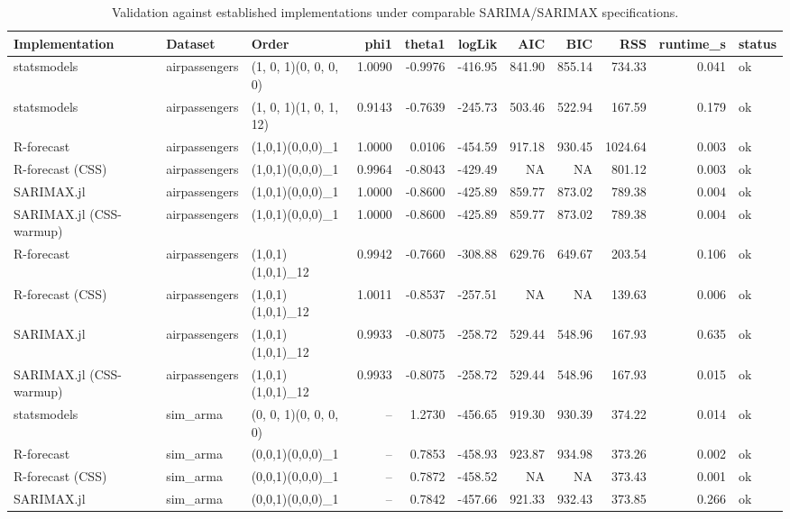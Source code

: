 \begin{table}[t]
\centering
\caption{Validation against established implementations under comparable SARIMA/SARIMAX specifications.}
\label{tab:validation_implementations}
\begin{tabular}{lllrrrrrrrl}
\hline
Implementation & Dataset & Order & phi1 & theta1 & logLik & AIC & BIC & RSS & runtime\_s & status \\
\hline
statsmodels & airpassengers & (1, 0, 1)(0, 0, 0, 0) & 1.0090 & -0.9976 & -416.95 & 841.90 & 855.14 & 734.33 & 0.041 & ok \\
statsmodels & airpassengers & (1, 0, 1)(1, 0, 1, 12) & 0.9143 & -0.7639 & -245.73 & 503.46 & 522.94 & 167.59 & 0.179 & ok \\
R-forecast & airpassengers & (1,0,1)(0,0,0)\_1 & 1.0000 & 0.0106 & -454.59 & 917.18 & 930.45 & 1024.64 & 0.003 & ok \\
R-forecast (CSS) & airpassengers & (1,0,1)(0,0,0)\_1 & 0.9964 & -0.8043 & -429.49 & NA & NA & 801.12 & 0.003 & ok \\
SARIMAX.jl & airpassengers & (1,0,1)(0,0,0)\_1 & 1.0000 & -0.8600 & -425.89 & 859.77 & 873.02 & 789.38 & 0.004 & ok \\
SARIMAX.jl (CSS-warmup) & airpassengers & (1,0,1)(0,0,0)\_1 & 1.0000 & -0.8600 & -425.89 & 859.77 & 873.02 & 789.38 & 0.004 & ok \\
R-forecast & airpassengers & (1,0,1)(1,0,1)\_12 & 0.9942 & -0.7660 & -308.88 & 629.76 & 649.67 & 203.54 & 0.106 & ok \\
R-forecast (CSS) & airpassengers & (1,0,1)(1,0,1)\_12 & 1.0011 & -0.8537 & -257.51 & NA & NA & 139.63 & 0.006 & ok \\
SARIMAX.jl & airpassengers & (1,0,1)(1,0,1)\_12 & 0.9933 & -0.8075 & -258.72 & 529.44 & 548.96 & 167.93 & 0.635 & ok \\
SARIMAX.jl (CSS-warmup) & airpassengers & (1,0,1)(1,0,1)\_12 & 0.9933 & -0.8075 & -258.72 & 529.44 & 548.96 & 167.93 & 0.015 & ok \\
statsmodels & sim\_arma & (0, 0, 1)(0, 0, 0, 0) & -- & 1.2730 & -456.65 & 919.30 & 930.39 & 374.22 & 0.014 & ok \\
R-forecast & sim\_arma & (0,0,1)(0,0,0)\_1 & -- & 0.7853 & -458.93 & 923.87 & 934.98 & 373.26 & 0.002 & ok \\
R-forecast (CSS) & sim\_arma & (0,0,1)(0,0,0)\_1 & -- & 0.7872 & -458.52 & NA & NA & 373.43 & 0.001 & ok \\
SARIMAX.jl & sim\_arma & (0,0,1)(0,0,0)\_1 & -- & 0.7842 & -457.66 & 921.33 & 932.43 & 373.85 & 0.266 & ok \\

\end{tabular}
\end{table}
